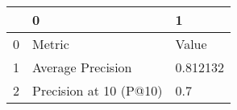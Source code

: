 \begin{tabular}{lll}
\toprule
{} &                       0 &         1 \\
\midrule
0 &                  Metric &     Value \\
1 &       Average Precision &  0.812132 \\
2 &  Precision at 10 (P@10) &       0.7 \\
\bottomrule
\end{tabular}
